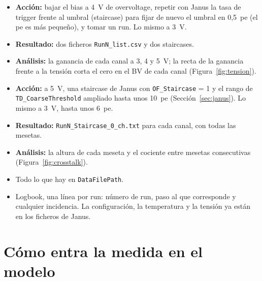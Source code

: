\documentclass[11pt,a4paper]{article}
\begin{document}
\begin{itemize}
\item {\bf Acción:} bajar el bias a 4~V de overvoltage, repetir con Janus
  la tasa de trigger frente al umbral (staircase) para fijar de nuevo el umbral en 0,5~pe (el pe es más
  pequeño), y tomar un run. Lo mismo a 3~V.
\item {\bf Resultado:} dos ficheros \texttt{RunN\_list.csv} y dos staircases.
\item {\bf Análisis:} la ganancia de cada canal a 3, 4 y 5~V; la recta de
  la ganancia frente a la tensión corta el cero en el BV de cada canal
  (Figura~\ref{fig:tension}).
\end{itemize}

\begin{itemize}
\item {\bf Acción:} a 5~V, una staircase de Janus con
  \texttt{OF\_Staircase} = 1 y el rango de \texttt{TD\_CoarseThreshold}
  ampliado hasta unos 10~pe (Sección~\ref{sec:janus}). Lo mismo a 3~V,
  hasta unos 6~pe.
\item {\bf Resultado:} \texttt{RunN\_Staircase\_0\_ch.txt} para cada canal,
  con todas las mesetas.
\item {\bf Análisis:} la altura de cada meseta y el cociente entre mesetas
  consecutivas (Figura~\ref{fig:crosstalk}).
\end{itemize}

\begin{itemize}
\item Todo lo que hay en \texttt{DataFilePath}.
\item Logbook, una línea por run: número de run, paso al que corresponde y
  cualquier incidencia. La configuración, la temperatura y la tensión ya
  están en los ficheros de Janus.
\end{itemize}

\section{Cómo entra la medida en el modelo}
\label{sec:razon}
\end{document}
